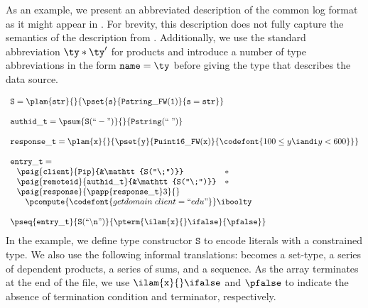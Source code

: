 As an example, we present an abbreviated description of the common log
format as it might appear in \ddc{}. For brevity,
this description does not fully capture the semantics of the
\ipads{} description from . Additionally, we
use the standard abbreviation $\ty * \ty'$ for products and introduce a number of type abbreviations
in the form $\mathtt{name} = \ty$ before giving the type that describes the data source.

{\small
\[
\begin{array}{l}
\mathtt{S} = \plam {\mathtt{str}} {} {\pset {\mathtt{s}}
  {\mathtt{Pstring\_FW(1)}} {\mathtt{s = str}}}\\
\\
\mathtt{authid\_t} = 
\psum {\mathtt{S(``-")}} {} {\mathtt{Pstring(``\;")}}\\
\\
\mathtt{response\_t} = \plam {\mathtt x} {} {
      \pset {\mathtt y} {\mathtt{Puint16\_FW(x)}} 
      {\codefont{100 \leq y \iandi y < 600}}
    }\\
\\
\mathtt{entry\_t} = \\ \;
\begin{array}{lll}
\psig {\mathtt{client}} {\mathtt{Pip}} {&\mathtt{S(``\;")}} &* \\
\psig {\mathtt{remoteid}} {\mathtt{authid\_t}} {&\mathtt{S(``\;")}} &* \\
\psig {\mathtt{response}} {
  \papp
    {\mathtt{response\_t}} 3
}{} \\
\multicolumn{3}{c}{
\quad \pcompute {\codefont{getdomain\;client = ``edu"}} \iboolty}
\end{array}\\
\\
\pseq {\mathtt{entry\_t}} {\mathtt{S(``\backslash n")}}{
  \pterm {\ilam {\mathtt x} {} \ifalse} {\pfalse}
}
\end{array}
\]}%
\noindent
In the example, we define type constructor $\mathtt{S}$ to encode literals
with a constrained type. We also use the following
informal translations: \Pwhere{} becomes a set-type, \Pstruct{} a
series of dependent products, \Punion{} a series of sums, and
\Parray{} a sequence. As the array terminates at the end of the file, we
use $\ilam {\mathtt x} {} \ifalse$ and $\pfalse$ to indicate the
absence of termination condition and terminator, respectively.

